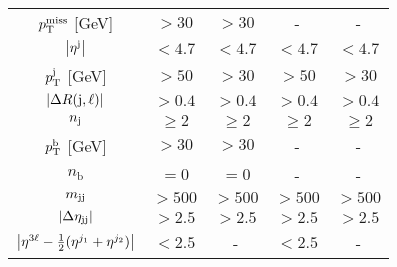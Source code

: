 \begin{table}[!ht]
\begin{center}
\begin{tabular}{c|c|c|c|c}
  $p_{\mathrm{T}}^\text{miss}                  $ [GeV] & $> 30$       & $> 30$     &   -            &   -     \\
  $\left|\eta^{\mathrm{j}}\right|  $      & $< 4.7$   & $< 4.7$       & $< 4.7$        & $< 4.7$ \\
    $p_{\mathrm{T}}^{\mathrm{j}}                $ [GeV] & $ > 50$   & $> 30$        & $> 50$         & $> 30$  \\
  $\left|\Delta R(\mathrm{j}, \ell)\right|$            & $ > 0.4$  & $> 0.4$       & $> 0.4$        & $> 0.4$ \\
  $n_{\mathrm{\mathrm{j}}}           $    & $\ge 2$   & $\ge 2$       & $\ge 2$        & $\ge 2$    \\
  $p_{\mathrm{T}}^{\mathrm{b}}         $ [GeV] & $ > 30$   & $ > 30$       &   -            &   -     \\
  $n_{\mathrm{b}}       $         & $= 0$     & $= 0$         &   -            &   -     \\
  $m_{\mathrm{jj}}             $               & $> 500$   & $> 500$       & $> 500$        & $> 500$ \\
  $\left|\Delta\eta_{\mathrm{jj}} \right|$            &$> 2.5$         & $> 2.5$ & $> 2.5$ & $> 2.5$ \\
  $\left| \eta^{3\ell} - \frac{1}{2}(\eta^{j_{1}} + \eta^{j_{2}}) \right|$            & $< 2.5$ & - & $< 2.5$ & - \\
  \end{tabular}
  \label{tab:selections}
  \end{center}
\end{table}



